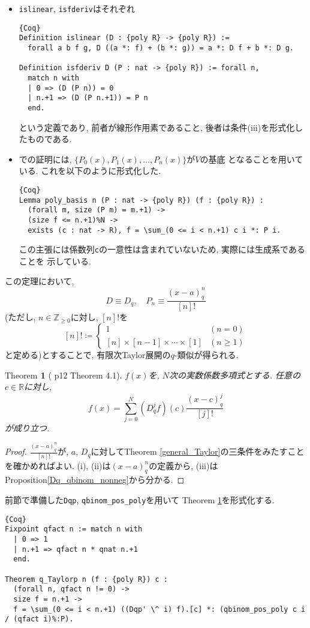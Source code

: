 \documentclass[11pt]{jsreport}
\theoremstyle{mystyle}
\newtheorem{thm}[df]{$\textrm{Theorem}$}
\newcommand{\bthm}{\begin{shadebox} \begin{thm}}
\newcommand{\ethm}{\end{thm} \end{shadebox}}
\newcommand{\bpf}{\begin{proof}}
\newcommand{\epf}{\end{proof}}
\newcommand{\Z}{\mathbb{Z}}
\newcommand{\R}{\mathbb{R}}
\newcommand{\0}{\textbf{0}}
\newcommand{\1}{\textbf{1}}
\newcommand{\2}{\textbf{2}}
\begin{document}
\begin{itemize}
  \item {\tt islinear}, {\tt isfderiv}はそれぞれ
    \begin{lstlisting}{Coq}
Definition islinear (D : {poly R} -> {poly R}) :=
  forall a b f g, D ((a *: f) + (b *: g)) = a *: D f + b *: D g.

Definition isfderiv D (P : nat -> {poly R}) := forall n,
  match n with
  | 0 => (D (P n)) = 0
  | n.+1 => (D (P n.+1)) = P n
  end. \end{lstlisting}
    という定義であり, 前者が線形作用素であること, 後者は条件(iii)を形式化したものである. 
  \item \cite{Kac}での証明には, $\{P_0(x), P_1(x), \ldots , P_n(x)\}$が$V$の基底
    となることを用いている. これを以下のように形式化した. 
    \begin{lstlisting}{Coq}
Lemma poly_basis n (P : nat -> {poly R}) (f : {poly R}) :
  (forall m, size (P m) = m.+1) ->
  (size f <= n.+1)%N ->
  exists (c : nat -> R), f = \sum_(0 <= i < n.+1) c i *: P i. \end{lstlisting}
    この主張には係数列{\tt c}の一意性は含まれていないため, 実際には生成系であることを
    示している. 
\end{itemize}
この定理において, 
\[
  D \equiv D_q, \quad P_n \equiv \frac{(x-a)^n_q}{[n]!}
\]
(ただし, $n\in\Z_{\ge0}$に対し, $[n]!$を
\[
    [n]! \coloneqq \begin{cases}
                          1 & (n=0)\\
                          [n]\times[n-1]\times\cdots\times[1] & (n\ge1)
                        \end{cases}
\]
と定める)とすることで, 有限次Taylor展開の$q$-類似が得られる. 
\bthm[\cite{Kac} p12 Theorem 4.1] \label{q_Taylor}
$f(x)$を, $N$次の実数係数多項式とする. 任意の$c\in\R$に対し, 
  \[
    f(x) = \sum_{j=0}^N (D_q^jf)(c)\frac{(x-c)^j_q}{[j]!}
  \]
が成り立つ. 
\ethm
\bpf
$\frac{(x-a)^n_q}{[n]!}$が, $a$, $D_q$に対してTheorem \ref{general_Taylor}の三条件をみたすことを確かめればよい. (i), (ii)は$(x-a)^n_q$の定義から, (iii)はProposition\ref{Dq_qbinom_nonneg}から分かる. 
\epf
前節で準備した{\tt Dqp}, {\tt qbinom\_pos\_poly}を用いて Theorem \ref{q_Taylor}を形式化する. 
\begin{lstlisting}{Coq}
Fixpoint qfact n := match n with
  | 0 => 1
  | n.+1 => qfact n * qnat n.+1
  end.

Theorem q_Taylorp n (f : {poly R}) c :
  (forall n, qfact n != 0) ->
  size f = n.+1 ->
  f = \sum_(0 <= i < n.+1) ((Dqp' \^ i) f).[c] *: (qbinom_pos_poly c i / (qfact i)%:P).
\end{lstlisting}
\end{document}
